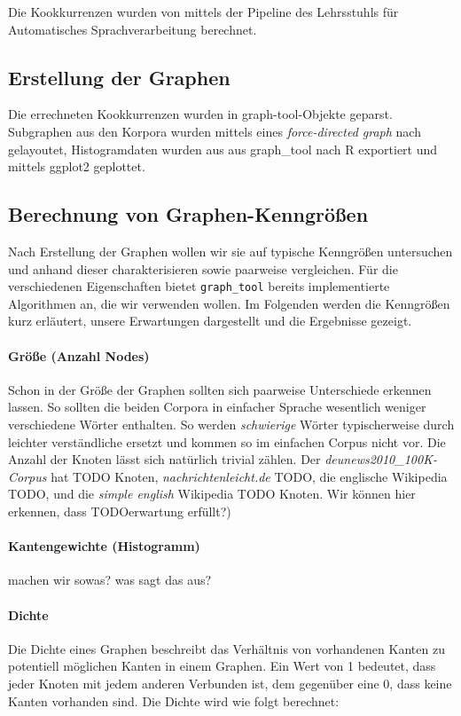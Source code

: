 \documentclass[12pt, a4paper]{article}
\begin{document}
Die Kookkurrenzen wurden von mittels der Pipeline des Lehrsstuhls f\"ur
Automatisches Sprachverarbeitung berechnet.

\subsection{Erstellung der Graphen}

Die errechneten Kookkurrenzen wurden in graph-tool-Objekte geparst. Subgraphen
aus den Korpora wurden mittels eines \emph{force-directed graph} nach
\cite{Hu2005} gelayoutet, Histogramdaten wurden aus aus graph\_tool nach R
exportiert und mittels ggplot2 geplottet.

\subsection{Berechnung von Graphen-Kenngr\"o\ss{}en}

Nach Erstellung der Graphen wollen wir sie auf typische Kenngrößen untersuchen
und anhand dieser charakterisieren sowie paarweise vergleichen. Für die
verschiedenen Eigenschaften bietet \texttt{graph\_tool} bereits implementierte
Algorithmen an, die wir verwenden wollen. Im Folgenden werden die Kenngrößen
kurz erläutert, unsere Erwartungen dargestellt und die Ergebnisse gezeigt.

\paragraph{Gr\"o\ss{}e (Anzahl Nodes)}
Schon in der Größe der Graphen sollten sich paarweise Unterschiede erkennen
lassen. So sollten die beiden Corpora in einfacher Sprache wesentlich weniger
verschiedene Wörter enthalten. So werden \emph{schwierige} Wörter
typischerweise durch leichter verständliche ersetzt und kommen so im einfachen
Corpus nicht vor. Die Anzahl der Knoten lässt sich natürlich trivial zählen.
Der \emph{deunews2010\_100K-Corpus} hat TODO Knoten,
\emph{nachrichtenleicht.de} TODO, die englische Wikipedia TODO, und die
\emph{simple english} Wikipedia TODO Knoten. Wir können hier erkennen, dass
TODOerwartung erfüllt?)
 
\paragraph{Kantengewichte (Histogramm)}
machen wir sowas? was sagt das aus?

\paragraph{Dichte}
Die Dichte eines Graphen beschreibt das Verhältnis von vorhandenen Kanten zu
potentiell möglichen Kanten in einem Graphen. Ein Wert von 1 bedeutet, dass
jeder Knoten mit jedem anderen Verbunden ist, dem gegenüber eine 0, dass keine
Kanten vorhanden sind. Die Dichte wird wie folgt berechnet:
\end{document}
